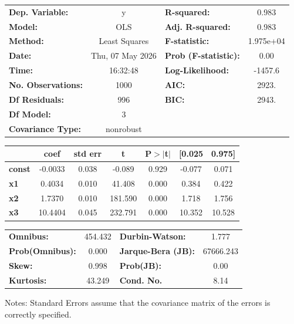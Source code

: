 \begin{center}
\begin{tabular}{lclc}
\toprule
\textbf{Dep. Variable:}    &        y         & \textbf{  R-squared:         } &     0.983   \\
\textbf{Model:}            &       OLS        & \textbf{  Adj. R-squared:    } &     0.983   \\
\textbf{Method:}           &  Least Squares   & \textbf{  F-statistic:       } & 1.975e+04   \\
\textbf{Date:}             & Thu, 07 May 2026 & \textbf{  Prob (F-statistic):} &     0.00    \\
\textbf{Time:}             &     16:32:48     & \textbf{  Log-Likelihood:    } &   -1457.6   \\
\textbf{No. Observations:} &        1000      & \textbf{  AIC:               } &     2923.   \\
\textbf{Df Residuals:}     &         996      & \textbf{  BIC:               } &     2943.   \\
\textbf{Df Model:}         &           3      & \textbf{                     } &             \\
\textbf{Covariance Type:}  &    nonrobust     & \textbf{                     } &             \\
\bottomrule
\end{tabular}
\begin{tabular}{lcccccc}
               & \textbf{coef} & \textbf{std err} & \textbf{t} & \textbf{P$> |$t$|$} & \textbf{[0.025} & \textbf{0.975]}  \\
\midrule
\textbf{const} &      -0.0033  &        0.038     &    -0.089  &         0.929        &       -0.077    &        0.071     \\
\textbf{x1}    &       0.4034  &        0.010     &    41.408  &         0.000        &        0.384    &        0.422     \\
\textbf{x2}    &       1.7370  &        0.010     &   181.590  &         0.000        &        1.718    &        1.756     \\
\textbf{x3}    &      10.4404  &        0.045     &   232.791  &         0.000        &       10.352    &       10.528     \\
\bottomrule
\end{tabular}
\begin{tabular}{lclc}
\textbf{Omnibus:}       & 454.432 & \textbf{  Durbin-Watson:     } &     1.777  \\
\textbf{Prob(Omnibus):} &   0.000 & \textbf{  Jarque-Bera (JB):  } & 67666.243  \\
\textbf{Skew:}          &   0.998 & \textbf{  Prob(JB):          } &      0.00  \\
\textbf{Kurtosis:}      &  43.249 & \textbf{  Cond. No.          } &      8.14  \\
\bottomrule
\end{tabular}
\end{center}

Notes: \newline
 [1] Standard Errors assume that the covariance matrix of the errors is correctly specified.